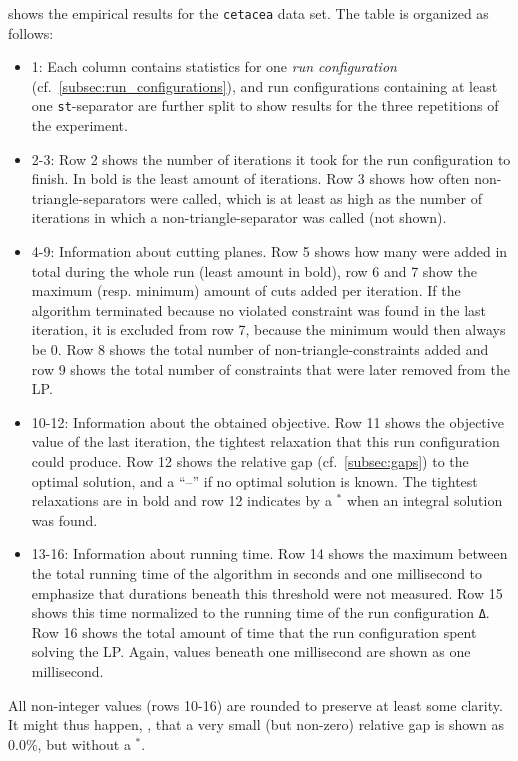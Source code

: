 \begin{landscape}
 shows the empirical results for the \texttt{cetacea} data set.
The table is organized as follows:
\begin{itemize}
	\item 1: Each column contains statistics for one \textit{run configuration} (cf.\ \cref{subsec:run_configurations}),
		and run configurations containing at least one \texttt{st}-separator are further split to show results for the three repetitions of the experiment.
	\item 2-3: Row 2 shows the number of iterations it took for the run configuration to finish. 
		In bold is the least amount of iterations.
		Row 3 shows how often non-triangle-separators were called, which is at least as high as the number of iterations in which a non-triangle-separator was called (not shown).
	\item 4-9: Information about cutting planes. 
		Row 5 shows how many were added in total during the whole run (least amount in bold),
		row 6 and 7 show the maximum (resp. minimum) amount of cuts added per iteration.
		If the algorithm terminated because no violated constraint was found in the last iteration, it is excluded from row 7, because the minimum would then always be 0.
		Row 8 shows the total number of non-triangle-constraints added
		and row 9 shows the total number of constraints that were later removed from the LP.
	\item 10-12: Information about the obtained objective.
		Row 11 shows the objective value of the last iteration, \ie the tightest relaxation that this run configuration could produce.
		Row 12 shows the relative gap (cf.\ \cref{subsec:gaps}) to the optimal solution, and a “–” if no optimal solution is known.
		The tightest relaxations are in bold and row 12 indicates by a $^{*}$ when an integral solution was found.
	\item 13-16: Information about running time.
		Row 14 shows the maximum between the total running time of the algorithm in seconds and one millisecond to emphasize that durations beneath this threshold were not measured.
		Row 15 shows this time normalized to the running time of the run configuration \texttt{Δ}.
		Row 16 shows the total amount of time that the run configuration spent solving the LP. Again, values beneath one millisecond are shown as one millisecond.
\end{itemize}
All non-integer values (rows 10-16) are rounded to preserve at least some clarity.
It might thus happen, \eg, that a very small (but non-zero) relative gap is shown as $0.0\%$, but without a $^{*}$.


\end{landscape}
